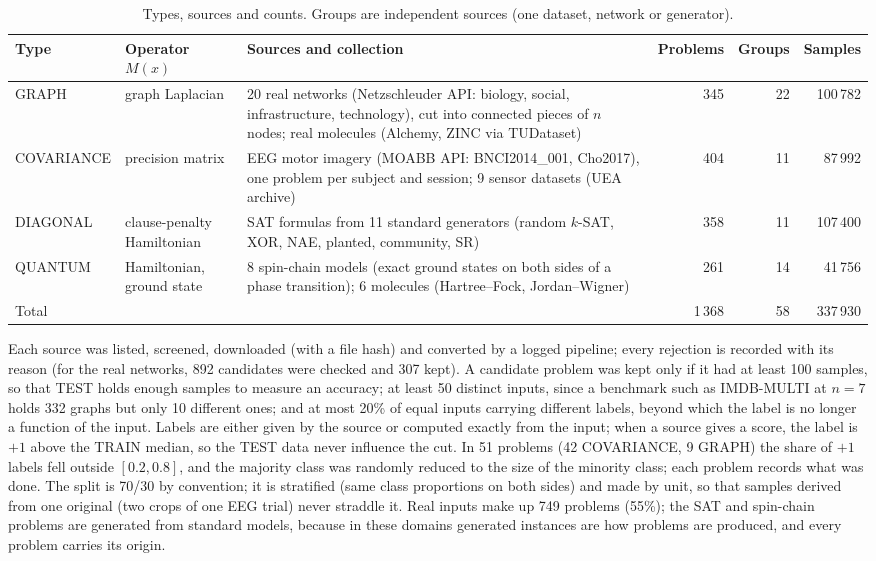 \documentclass[10pt,a4paper]{article}
\begin{document}
\begin{table}[h]
\centering\small
\caption{Types, sources and counts. Groups are independent sources (one dataset, network or generator).}\label{tab:types}
\begin{tabularx}{\linewidth}{@{}l l Y r r r@{}}
\toprule
Type & Operator $M(x)$ & Sources and collection & Problems & Groups & Samples\\
\midrule
GRAPH & graph Laplacian & 20 real networks (Netzschleuder API: biology, social, infrastructure, technology), cut into connected pieces of $n$ nodes; real molecules (Alchemy, ZINC via TUDataset) & 345 & 22 & 100\,782\\
COVARIANCE & precision matrix & EEG motor imagery (MOABB API: BNCI2014\_001, Cho2017), one problem per subject and session; 9 sensor datasets (UEA archive) & 404 & 11 & 87\,992\\
DIAGONAL & clause-penalty Hamiltonian & SAT formulas from 11 standard generators (random $k$-SAT, XOR, NAE, planted, community, SR) & 358 & 11 & 107\,400\\
QUANTUM & Hamiltonian, ground state & 8 spin-chain models (exact ground states on both sides of a phase transition); 6 molecules (Hartree--Fock, Jordan--Wigner) & 261 & 14 & 41\,756\\
\midrule
Total & & & 1\,368 & 58 & 337\,930\\
\bottomrule
\end{tabularx}
\end{table}

Each source was listed, screened, downloaded (with a file hash) and converted by a logged pipeline; every
rejection is recorded with its reason (for the real networks, 892 candidates were checked and 307 kept). A
candidate problem was kept only if it had at least 100 samples, so that TEST holds enough samples to measure an
accuracy; at least 50 distinct inputs, since a benchmark such as IMDB-MULTI at $n = 7$ holds 332 graphs but only
10 different ones; and at most 20\% of equal inputs carrying different labels, beyond which the label is no
longer a function of the input. Labels are either given by the source or computed exactly from the input; when a
source gives a score, the label is $+1$ above the TRAIN median, so the TEST data never influence the cut. In 51
problems (42 COVARIANCE, 9 GRAPH) the share of $+1$ labels fell outside $[0.2, 0.8]$, and the majority class was
randomly reduced to the size of the minority class; each problem records what was done. The split is 70/30 by
convention; it is stratified (same class proportions on both sides) and made by unit, so that samples derived
from one original (two crops of one EEG trial) never straddle it. Real inputs make up 749 problems (55\%); the
SAT and spin-chain problems are generated from standard models, because in these domains generated instances
are how problems are produced, and every problem carries its origin.
\end{document}
